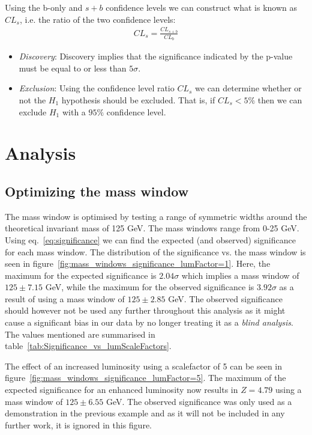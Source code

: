 \documentclass[12pt,a4paper]{amsart}
\begin{document}
Using the b-only and $s+b$ confidence levels we can construct what is known as $CL_s$, i.e. the ratio of the two confidence levels:
\begin{align}
CL_s = \frac{CL_{s+b}}{CL_b}	\label{eq:CL_s}
\end{align}
\begin{itemize}
\item \textit{Discovery}: Discovery implies that the significance indicated by the p-value must be equal to or less than $5\sigma$. 
\item \textit{Exclusion}: Using the confidence level ratio $CL_s$ we can determine whether or not the $H_1$ hypothesis should be excluded. That is, if $CL_s < 5\%$ then we can exclude $H_1$ with a $95\%$ confidence level.
\end{itemize}

\section{Analysis} \label{sec:Analysis}
\subsection{Optimizing the mass window} \label{subsec:Analysis-(optimizing_the_mass_window)}
The mass window is optimised by testing a range of symmetric widths around the theoretical invariant mass of 125 GeV. The mass windows range from 0-25 GeV. Using eq.~\eqref{eq:significance} we can find the expected (and observed) significance for each mass window. The distribution of the significance vs. the mass window is seen in figure~\ref{fig:mass_windows_significance_lumFactor=1}. Here, the maximum for the expected significance is $2.04\sigma$ which implies a mass window of $125\pm 7.15$ GeV, while the maximum for the observed significance is $3.92\sigma$ as a result of using a mass window of $125 \pm 2.85$ GeV. The observed significance should however not be used any further throughout this analysis as it might cause a significant bias in our data by no longer treating it as a \textit{blind analysis}. The values mentioned are summarised in table~\ref{tab:Significance_vs_lumScaleFactors}.

The effect of an increased luminosity using a scalefactor of 5 can be seen in figure~\ref{fig:mass_windows_significance_lumFactor=5}. The maximum of the expected significance for an enhanced luminosity now results in $Z = 4.79$ using a mass window of $125\pm6.55$ GeV. The observed significance was only used as a demonstration in the previous example and as it will not be included in any further work, it is ignored in this figure.
\end{document}
